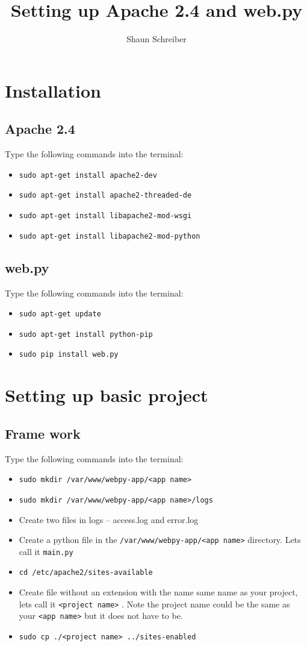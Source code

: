 \documentclass{article}
\author{Shaun Schreiber}
\title{Setting up Apache 2.4 and web.py}
\date{}
\begin{document}
\maketitle

\section{Installation}
\subsection{Apache 2.4}
Type the following commands into the terminal:
\begin{itemize}
\item \verb#sudo apt-get install apache2-dev#
\item \verb#sudo apt-get install apache2-threaded-de#
\item \verb#sudo apt-get install libapache2-mod-wsgi#
\item \verb#sudo apt-get install libapache2-mod-python#
\end{itemize}
\subsection{web.py}
Type the following commands into the terminal:
\begin{itemize}
\item \verb#sudo apt-get update#
\item \verb#sudo apt-get install python-pip#
\item \verb#sudo pip install web.py#
\end{itemize}

\section{Setting up basic project}
\subsection{Frame work}
Type the following commands into the terminal:
\begin{itemize}
\item \verb#sudo mkdir /var/www/webpy-app/<app name>#
\item \verb#sudo mkdir /var/www/webpy-app/<app name>/logs#
\item Create two files in logs -- access.log and error.log
\item Create a python file in the \verb#/var/www/webpy-app/<app name># directory. Lets call it \verb#main.py#
\item \verb#cd /etc/apache2/sites-available#
\item Create file without an extension with the name same name as your project, lets call it \verb#<project name># . Note the project name could be the same as your \verb#<app name># but it does not have to be.
\item \verb#sudo cp ./<project name> ../sites-enabled#
\end{itemize}
\end{document}
